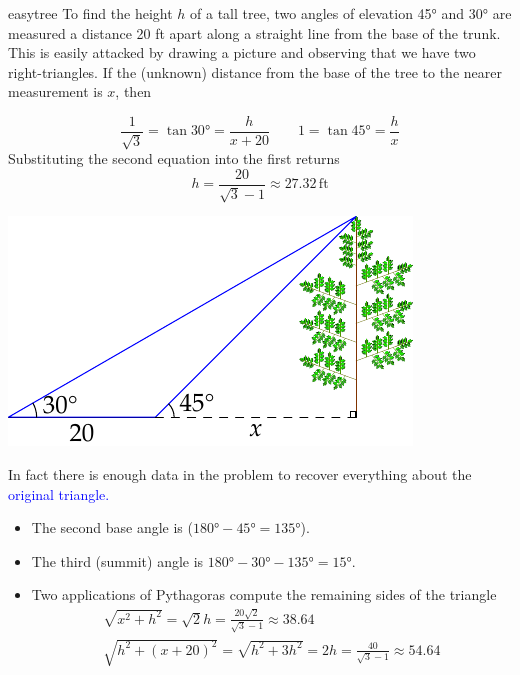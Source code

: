 \begin{example}{}{easytree}
	To find the height $h$ of a tall tree, two angles of elevation \ang{45} and \ang{30} are measured a distance 20 ft apart along a straight line from the base of the trunk.\smallbreak
	This is easily attacked by drawing a picture and observing that we have two right-triangles. If the (unknown) distance from the base of the tree to the nearer measurement is $x$, then\par
	\begin{minipage}[t]{0.54\linewidth}\vspace{-7pt}
		\[
			\frac 1{\sqrt 3}=\tan\ang{30}=\frac h{x+20}\qquad 1=\tan\ang{45}=\frac hx
		\]
		Substituting the second equation into the first returns
		\[
			h=\frac{20}{\sqrt 3-1}\approx 27.32\,\text{ft}
		\]
	\end{minipage}
	\hfill
	\begin{minipage}[t]{0.45\linewidth}\vspace{-12pt}
		\flushright\includegraphics{tree2}
	\end{minipage}\smallbreak
		In fact there is enough data in the problem to recover everything about the \textcolor{blue}{original triangle.}
	\begin{itemize}\itemsep2pt
	  \item The second base angle is ($\ang{180}-\ang{45}=\ang{135}$).
	  \item The third (summit) angle is $\ang{180}-\ang{30}-\ang{135}=\ang{15}$.
	  \item Two applications of Pythagoras compute the remaining sides of the triangle
	  \begin{gather*}
	  	\sqrt{x^2+h^2}=\sqrt 2h=\frac{20\sqrt 2}{\sqrt 3-1}\approx 38.64\\
	  	\sqrt{h^2+(x+20)^2}=\sqrt{h^2+3h^2}=2h=\frac{40}{\sqrt 3-1}\approx 54.64
	  \end{gather*}
	\end{itemize}
\end{example}

